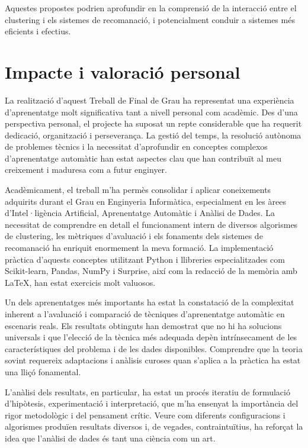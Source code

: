 \documentclass[a4paper,12pt]{report}
\begin{document}
Aquestes propostes podrien aprofundir en la comprensió de la interacció entre el clustering i els sistemes de recomanació, i potencialment conduir a sistemes més eficients i efectius.

\section{Impacte i valoració personal}
\label{sec:valoracio_personal}

La realització d'aquest Treball de Final de Grau ha representat una experiència d'aprenentatge molt significativa tant a nivell personal com acadèmic. Des d'una perspectiva personal, el projecte ha suposat un repte considerable que ha requerit dedicació, organització i perseverança. La gestió del temps, la resolució autònoma de problemes tècnics i la necessitat d'aprofundir en conceptes complexos d'aprenentatge automàtic han estat aspectes clau que han contribuït al meu creixement i maduresa com a futur enginyer.

Acadèmicament, el treball m'ha permès consolidar i aplicar coneixements adquirits durant el Grau en Enginyeria Informàtica, especialment en les àrees d'Intel·ligència Artificial, Aprenentatge Automàtic i Anàlisi de Dades. La necessitat de comprendre en detall el funcionament intern de diversos algorismes de clustering, les mètriques d'avaluació i els fonaments dels sistemes de recomanació ha enriquit enormement la meva formació. La implementació pràctica d'aquests conceptes utilitzant Python i llibreries especialitzades com Scikit-learn, Pandas, NumPy i Surprise, així com la redacció de la memòria amb LaTeX, han estat exercicis molt valuosos.

Un dels aprenentatges més importants ha estat la constatació de la complexitat inherent a l'avaluació i comparació de tècniques d'aprenentatge automàtic en escenaris reals. Els resultats obtinguts han demostrat que no hi ha solucions universals i que l'elecció de la tècnica més adequada depèn intrínsecament de les característiques del problema i de les dades disponibles. Comprendre que la teoria sovint requereix adaptacions i anàlisis curoses quan s'aplica a la pràctica ha estat una lliçó fonamental.

L'anàlisi dels resultats, en particular, ha estat un procés iteratiu de formulació d'hipòtesis, experimentació i interpretació, que m'ha ensenyat la importància del rigor metodològic i del pensament crític. Veure com diferents configuracions i algorismes produïen resultats diversos i, de vegades, contraintuïtius, ha reforçat la idea que l'anàlisi de dades és tant una ciència com un art.
\end{document}
